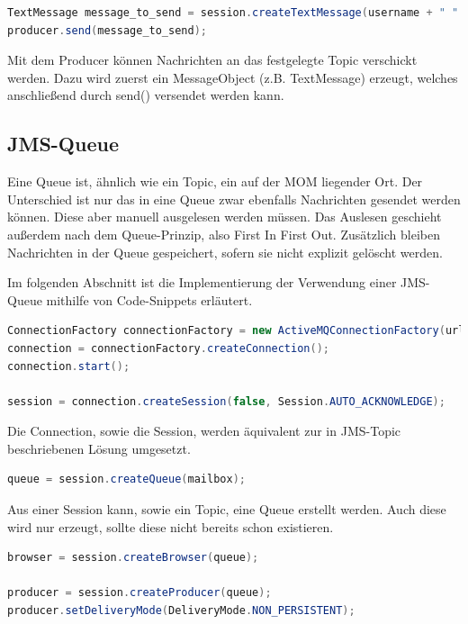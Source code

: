 \documentclass[11pt, a4paper]{article}
\begin{document}
\begin{lstlisting}[language=Java]
TextMessage message_to_send = session.createTextMessage(username + " " +  ip + ": " + message);
producer.send(message_to_send);
\end{lstlisting}

Mit dem Producer können Nachrichten an das festgelegte Topic verschickt werden. Dazu wird zuerst ein MessageObject (z.B. TextMessage) erzeugt, welches
anschließend durch send() versendet werden kann.

\subsection{JMS-Queue}
Eine Queue ist, ähnlich wie ein Topic, ein auf der MOM liegender Ort. Der Unterschied ist nur das in eine Queue zwar ebenfalls Nachrichten gesendet werden
können. Diese aber manuell ausgelesen werden müssen. Das Auslesen geschieht außerdem nach dem Queue-Prinzip, also First In First Out. Zusätzlich bleiben
Nachrichten in der Queue gespeichert, sofern sie nicht explizit gelöscht werden.

Im folgenden Abschnitt ist die Implementierung der Verwendung einer JMS-Queue mithilfe von Code-Snippets erläutert.

\begin{lstlisting}[language=Java]
ConnectionFactory connectionFactory = new ActiveMQConnectionFactory(url);
connection = connectionFactory.createConnection();
connection.start();
			
session = connection.createSession(false, Session.AUTO_ACKNOWLEDGE);
\end{lstlisting}

Die Connection, sowie die Session, werden äquivalent zur in JMS-Topic beschriebenen Lösung umgesetzt.

\begin{lstlisting}[language=Java]
queue = session.createQueue(mailbox);
\end{lstlisting}

Aus einer Session kann, sowie ein Topic, eine Queue erstellt werden. Auch diese wird nur erzeugt, sollte diese nicht bereits schon existieren.

\begin{lstlisting}[language=Java]
browser = session.createBrowser(queue);

producer = session.createProducer(queue);
producer.setDeliveryMode(DeliveryMode.NON_PERSISTENT);
\end{lstlisting}
\end{document}

